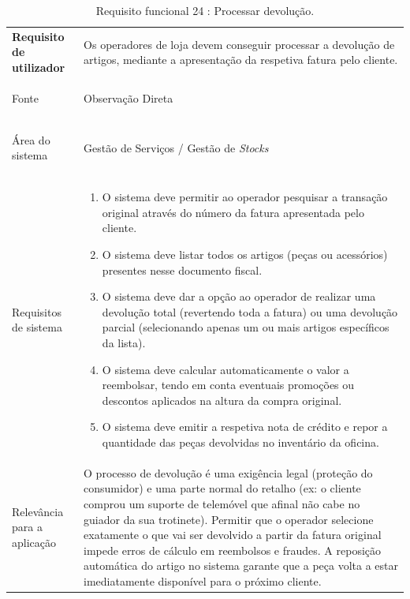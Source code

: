 \documentclass[a4paper,12pt]{scrreprt}
\begin{document}
\begin{table}[H]
    \centering
    \renewcommand{\arraystretch}{1.5} 
    
    \begin{tabular}{|>{\columncolor{gray!15}\bfseries}p{4cm}|p{10.5cm}|}
        \hline
        Requisito de utilizador & Os operadores de loja devem conseguir processar a devolução de artigos, mediante a apresentação da respetiva fatura pelo cliente. \\ \hdashline
        
        Fonte & Observação Direta \\ \hdashline
        
        Área do sistema & Gestão de Serviços / Gestão de \textit{Stocks} \\ \hdashline
        
        Requisitos de sistema & 
        \begin{enumerate}[leftmargin=*, nosep, topsep=2pt, partopsep=0pt]
            \item O sistema deve permitir ao operador pesquisar a transação original através do número da fatura apresentada pelo cliente.
            \item O sistema deve listar todos os artigos (peças ou acessórios) presentes nesse documento fiscal.
            \item O sistema deve dar a opção ao operador de realizar uma devolução total (revertendo toda a fatura) ou uma devolução parcial (selecionando apenas um ou mais artigos específicos da lista).
            \item O sistema deve calcular automaticamente o valor a reembolsar, tendo em conta eventuais promoções ou descontos aplicados na altura da compra original.
            \item O sistema deve emitir a respetiva nota de crédito e repor a quantidade das peças devolvidas no inventário da oficina.
        \end{enumerate} \\ \hdashline
        
        Relevância para a aplicação & O processo de devolução é uma exigência legal (proteção do consumidor) e uma parte normal do retalho (ex: o cliente comprou um suporte de telemóvel que afinal não cabe no guiador da sua trotinete). Permitir que o operador selecione exatamente o que vai ser devolvido a partir da fatura original impede erros de cálculo em reembolsos e fraudes. A reposição automática do artigo no sistema garante que a peça volta a estar imediatamente disponível para o próximo cliente.\\ \hline
    \end{tabular}
    \caption{Requisito funcional 24 : Processar devolução.}
    \label{tab:rf_processar_devolucao}
\end{table}
\end{document}
